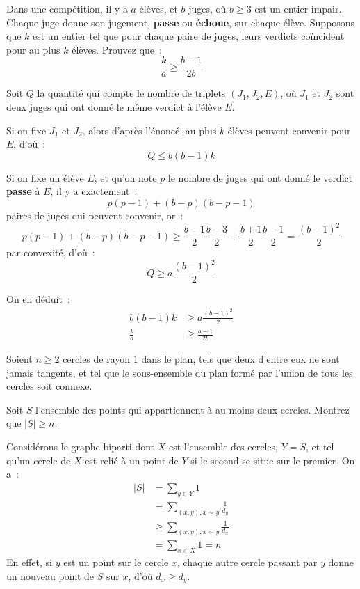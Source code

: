 \begin{exo}[P2 IMO 1998]
	Dans une compétition, il y a $a$ élèves, et $b$ juges, où $b \ge 3$ est un entier impair. Chaque juge donne son jugement, \textbf{passe} ou \textbf{échoue}, sur chaque élève. Supposons que $k$ est un entier tel que pour chaque paire de juges, leurs verdicts coïncident pour au plus $k$ élèves. Prouvez que~:
	$$\frac{k}{a} \ge \frac{b - 1}{2b}$$
\end{exo}
\begin{sol}
	Soit $Q$ la quantité qui compte le nombre de triplets $(J_1, J_2, E)$, où $J_1$ et $J_2$ sont deux juges qui ont donné le même verdict à l'élève $E$.
	
	Si on fixe $J_1$ et $J_2$, alors d'après l'énoncé, au plus $k$ élèves peuvent convenir pour $E$, d'où~:
	$$Q \le b(b - 1)k$$
	
	Si on fixe un élève $E$, et qu'on note $p$ le nombre de juges qui ont donné le verdict \textbf{passe} à $E$, il y a exactement~:
	$$p(p - 1) + (b - p)(b - p - 1)$$
	paires de juges qui peuvent convenir, or~:
	$$p(p - 1) + (b - p)(b - p - 1) \ge \frac{b - 1}2\frac{b - 3}2 + \frac{b + 1}2\frac{b - 1}2 = \frac{(b - 1)^2}2$$
	par convexité, d'où~:
	$$Q \ge a\frac{(b - 1)^2}2$$
	
	On en déduit~:
	\begin{align*}
		b(b - 1)k &\ge a\frac{(b - 1)^2}2 \\
		\frac{k}{a} &\ge \frac{b - 1}{2b}
	\end{align*}
\end{sol}

\begin{exo}[Iran 1999]
	Soient $n \ge 2$ cercles de rayon $1$ dans le plan, tels que deux d'entre eux ne sont jamais tangents, et tel que le sous-ensemble du plan formé par l'union de tous les cercles soit connexe.
	
	Soit $S$ l'ensemble des points qui appartiennent à au moins deux cercles.
	Montrez que $|S| \ge n$.
\end{exo}
\begin{sol}
	Considérons le graphe biparti dont $X$ est l'ensemble des cercles, $Y = S$, et tel qu'un cercle de $X$ est relié à un point de $Y$ si le second se situe sur le premier.
	On a~:
	\begin{align*}
	|S| &= \sum_{y \in Y} 1 \\
	&= \sum_{(x, y), x \sim y} \frac1{d_y} \\
	&\ge \sum_{(x, y), x \sim y} \frac1{d_x} \\
	&= \sum_{x \in X} 1 = n
	\end{align*}
	En effet, si $y$ est un point sur le cercle $x$, chaque autre cercle passant par $y$ donne un nouveau point de $S$ sur $x$, d'où $d_x \ge d_y$.
\end{sol}
